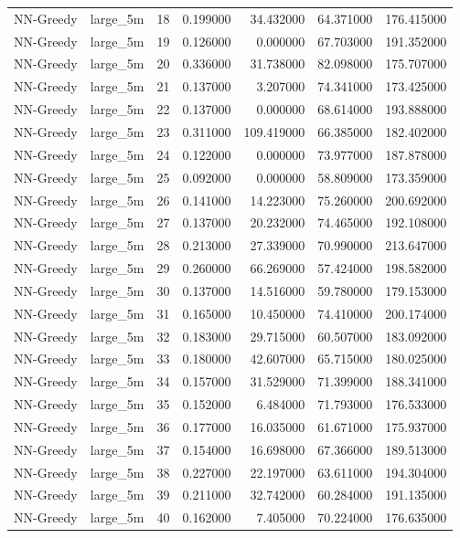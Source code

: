 \begin{tabular}{llrrrrr}
NN-Greedy & large_5m & 18 & 0.199000 & 34.432000 & 64.371000 & 176.415000 \\
NN-Greedy & large_5m & 19 & 0.126000 & 0.000000 & 67.703000 & 191.352000 \\
NN-Greedy & large_5m & 20 & 0.336000 & 31.738000 & 82.098000 & 175.707000 \\
NN-Greedy & large_5m & 21 & 0.137000 & 3.207000 & 74.341000 & 173.425000 \\
NN-Greedy & large_5m & 22 & 0.137000 & 0.000000 & 68.614000 & 193.888000 \\
NN-Greedy & large_5m & 23 & 0.311000 & 109.419000 & 66.385000 & 182.402000 \\
NN-Greedy & large_5m & 24 & 0.122000 & 0.000000 & 73.977000 & 187.878000 \\
NN-Greedy & large_5m & 25 & 0.092000 & 0.000000 & 58.809000 & 173.359000 \\
NN-Greedy & large_5m & 26 & 0.141000 & 14.223000 & 75.260000 & 200.692000 \\
NN-Greedy & large_5m & 27 & 0.137000 & 20.232000 & 74.465000 & 192.108000 \\
NN-Greedy & large_5m & 28 & 0.213000 & 27.339000 & 70.990000 & 213.647000 \\
NN-Greedy & large_5m & 29 & 0.260000 & 66.269000 & 57.424000 & 198.582000 \\
NN-Greedy & large_5m & 30 & 0.137000 & 14.516000 & 59.780000 & 179.153000 \\
NN-Greedy & large_5m & 31 & 0.165000 & 10.450000 & 74.410000 & 200.174000 \\
NN-Greedy & large_5m & 32 & 0.183000 & 29.715000 & 60.507000 & 183.092000 \\
NN-Greedy & large_5m & 33 & 0.180000 & 42.607000 & 65.715000 & 180.025000 \\
NN-Greedy & large_5m & 34 & 0.157000 & 31.529000 & 71.399000 & 188.341000 \\
NN-Greedy & large_5m & 35 & 0.152000 & 6.484000 & 71.793000 & 176.533000 \\
NN-Greedy & large_5m & 36 & 0.177000 & 16.035000 & 61.671000 & 175.937000 \\
NN-Greedy & large_5m & 37 & 0.154000 & 16.698000 & 67.366000 & 189.513000 \\
NN-Greedy & large_5m & 38 & 0.227000 & 22.197000 & 63.611000 & 194.304000 \\
NN-Greedy & large_5m & 39 & 0.211000 & 32.742000 & 60.284000 & 191.135000 \\
NN-Greedy & large_5m & 40 & 0.162000 & 7.405000 & 70.224000 & 176.635000 \\

\end{tabular}
